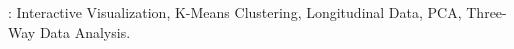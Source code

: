 \begin{singlespace}
\vspace*{0.4cm}

\noindent {}:
    Interactive Visualization, K-Means Clustering, Longitudinal Data, PCA, Three-Way Data Analysis.
\vfill
\end{singlespace}

\renewcommand{\figurename}{\normalsize Gambar}
\renewcommand{\tablename}{\normalsize Tabel}

\newpage